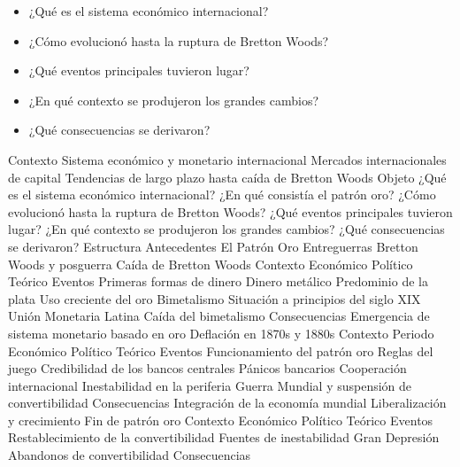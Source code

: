 \documentclass{nuevotema}
\begin{document}
\ideaclave

\begin{itemize}
	\item ¿Qué es el sistema económico internacional?
	\item ¿Cómo evolucionó hasta la ruptura de Bretton Woods?
	\item ¿Qué eventos principales tuvieron lugar?
	\item ¿En qué contexto se produjeron los grandes cambios?
	\item ¿Qué consecuencias se derivaron?
\end{itemize}

\esquemacorto

\begin{esquema}[enumerate]
	\1[] 
		\2 Contexto
			\3 Sistema económico y monetario internacional
			\3 Mercados internacionales de capital
			\3 Tendencias de largo plazo hasta caída de Bretton Woods
		\2 Objeto
			\3 ¿Qué es el sistema económico internacional?
			\3 ¿En qué consistía el patrón oro?
			\3 ¿Cómo evolucionó hasta la ruptura de Bretton Woods?
			\3 ¿Qué eventos principales tuvieron lugar?
			\3 ¿En qué contexto se produjeron los grandes cambios?
			\3 ¿Qué consecuencias se derivaron?
		\2 Estructura
			\3 Antecedentes
			\3 El Patrón Oro
			\3 Entreguerras
			\3 Bretton Woods y posguerra
			\3 Caída de Bretton Woods
	\1 
		\2 Contexto
			\3 Económico
			\3 Político
			\3 Teórico
		\2 Eventos
			\3 Primeras formas de dinero
			\3 Dinero metálico
			\3 Predominio de la plata
			\3 Uso creciente del oro
			\3 Bimetalismo
			\3 Situación a principios del siglo XIX
			\3 Unión Monetaria Latina
			\3 Caída del bimetalismo
		\2 Consecuencias
			\3 Emergencia de sistema monetario basado en oro
			\3 Deflación en 1870s y 1880s
	\1 
		\2 Contexto
			\3 Periodo
			\3 Económico
			\3 Político
			\3 Teórico
		\2 Eventos
			\3 Funcionamiento del patrón oro
			\3 Reglas del juego
			\3 Credibilidad de los bancos centrales
			\3 Pánicos bancarios
			\3 Cooperación internacional
			\3 Inestabilidad en la periferia
			\3 Guerra Mundial y suspensión de convertibilidad
		\2 Consecuencias
			\3 Integración de la economía mundial
			\3 Liberalización y crecimiento
			\3 Fin de patrón oro
	\1 
		\2 Contexto
			\3 Económico
			\3 Político
			\3 Teórico
		\2 Eventos
			\3 Restablecimiento de la convertibilidad
			\3 Fuentes de inestabilidad
			\3 Gran Depresión
			\3 Abandonos de convertibilidad
		\2 Consecuencias

\end{esquema}
\end{document}

